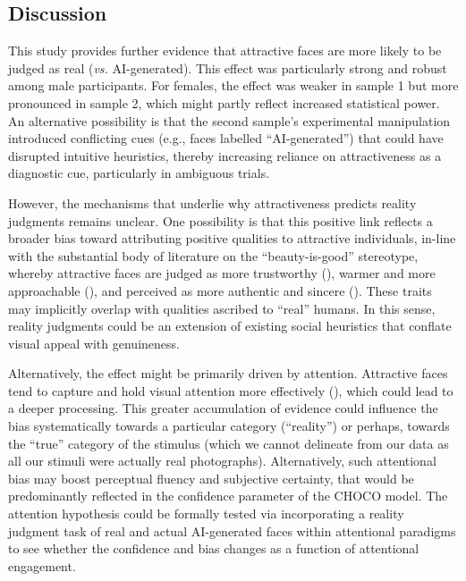 \documentclass[
  jou,
  floatsintext,
  longtable,
  nolmodern,
  notxfonts,
  notimes,
  colorlinks=true,linkcolor=blue,citecolor=blue,urlcolor=blue]{apa7}
\begin{document}
\subsection{Discussion}\label{discussion-1}

This study provides further evidence that attractive faces are more
likely to be judged as real (\emph{vs.} AI-generated). This effect was
particularly strong and robust among male participants. For females, the
effect was weaker in sample 1 but more pronounced in sample 2, which
might partly reflect increased statistical power. An alternative
possibility is that the second sample's experimental manipulation
introduced conflicting cues (e.g., faces labelled ``AI-generated'') that
could have disrupted intuitive heuristics, thereby increasing reliance
on attractiveness as a diagnostic cue, particularly in ambiguous trials.

However, the mechanisms that underlie why attractiveness predicts
reality judgments remains unclear. One possibility is that this positive
link reflects a broader bias toward attributing positive qualities to
attractive individuals, in-line with the substantial body of literature
on the ``beauty-is-good'' stereotype, whereby attractive faces are
judged as more trustworthy (), warmer and more approachable
(), and perceived as
more authentic and sincere (). These traits may implicitly overlap with qualities ascribed to
``real'' humans. In this sense, reality judgments could be an extension
of existing social heuristics that conflate visual appeal with
genuineness.

Alternatively, the effect might be primarily driven by attention.
Attractive faces tend to capture and hold visual attention more
effectively (), which could lead to a deeper processing. This greater
accumulation of evidence could influence the bias systematically towards
a particular category (``reality'') or perhaps, towards the ``true''
category of the stimulus (which we cannot delineate from our data as all
our stimuli were actually real photographs). Alternatively, such
attentional bias may boost perceptual fluency and subjective certainty,
that would be predominantly reflected in the confidence parameter of the
CHOCO model. The attention hypothesis could be formally tested via
incorporating a reality judgment task of real and actual AI-generated
faces within attentional paradigms to see whether the confidence and
bias changes as a function of attentional engagement.
\end{document}
